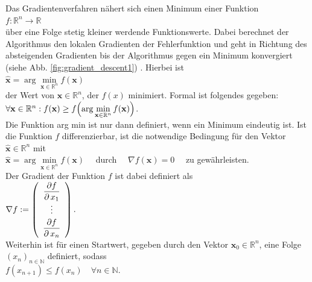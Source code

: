 \noindent
Das Gradientenverfahren nähert sich einen Minimum einer Funktion 
\\[0.2cm]
\hspace*{1.3cm}
$f:\mathbb{R}^n \rightarrow \mathbb{R}$
\\[0.2cm] 
über eine Folge stetig kleiner werdende Funktionswerte. Dabei berechnet der Algorithmus den lokalen Gradienten der Fehlerfunktion und geht in Richtung des absteigenden Gradienten bis der Algorithmus gegen ein Minimum konvergiert (siehe Abb. \ref{fig:gradient_descent1}) \cite{aurelien:2017}. Hierbei ist
\\[0.2cm]
\hspace*{1.3cm}
$\mathbf{\widehat{x}} = \arg\min\limits_{\mathbf{x}\in \mathbb{R}^n} f(\mathbf{x})$
\\[0.2cm] 
der Wert von $\mathbf{x} \in \mathbb{R}^n$, der $f(x)$ minimiert. Formal ist folgendes gegeben:
\\[0.2cm]
\hspace*{1.3cm}
$\forall \mathbf{x} \in \mathbb{R}^n : f(\mathbf{x}) \geq f\Bigl(\arg\min\limits_{\mathbf{x}\in \mathbb{R}^n} f(\mathbf{x})\Bigr)$.
\\[0.2cm]
Die Funktion arg min ist nur dann definiert, wenn ein Minimum eindeutig ist. Ist die Funktion $f$ differenzierbar, ist die notwendige Bedingung für den Vektor $\mathbf{\widehat{x}} \in \mathbb{R}^n$ mit 
\\[0.2cm]
\hspace*{1.3cm}
$\mathbf{\widehat{x}} = \arg\min\limits_{\mathbf{x}\in \mathbb{R}^n} f(\mathbf{x}) \quad$ durch $\quad \nabla f(\mathbf{x}) = 0 \quad$ zu gewährleisten.
\\[0.2cm]
Der Gradient der Funktion $f$ ist dabei definiert als
\\[0.2cm]
\hspace*{1.3cm}
$\nabla f := \left(
 \begin{array}{c}
 \displaystyle\frac{\partial f}{\partial\, x_1} \\
    \vdots                            \\[0.1cm]
 \displaystyle\frac{\partial f}{\partial\, x_n} \\ 
 \end{array}
 \right).
$
\\[0.2cm]
Weiterhin ist für einen Startwert, gegeben durch den Vektor $\mathbf{x}_0 \in \mathbb{R}^n$,  eine Folge $(x_n)_{n \in \mathbb{N}}$ definiert, sodass 
\\[0.2cm]
\hspace*{1.3cm}
$f(x_{n+1}) \leq f(x_n) \quad \forall n \in \mathbb{N}$.
\\[0.2cm] 


